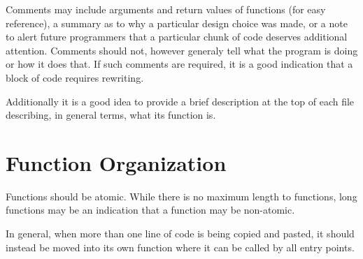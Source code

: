 \documentclass{article}
\begin{document}
Comments may include arguments and return values of functions (for easy
reference), a summary as to why a particular design choice was made, or a note
to alert future programmers that a particular chunk of code deserves additional
attention.  Comments should not, however generaly tell what the program is doing
or how it does that.  If such comments are required, it is a good indication
that a block of code requires rewriting.

Additionally it is a good idea to provide a brief description at the top of each
file describing, in general terms, what its function is.

\section{Function Organization}

Functions should be atomic.  While there is no maximum length to functions, long
functions may be an indication that a function may be non-atomic.

In general, when more than one line of code is being copied and pasted, it 
should instead be moved  into its own function where it can be called by all 
entry points.
\end{document}
